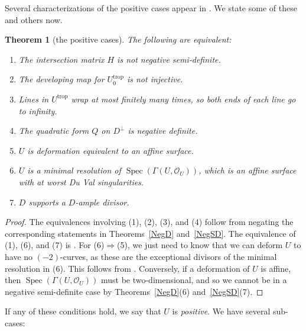 \documentclass[11pt]{article}
\numberwithin{equation}{section}
\numberwithin{figure}{section}
\numberwithin{table}{section}
\DeclareMathOperator{\Spec}{Spec}
\DeclareMathOperator{\trop}{trop}
\let\s=\mathcal
\newtheorem{thm}{Theorem}[section]
\theoremstyle{definition}
\begin{document}
Several characterizations of the positive cases appear in \cite[Lemma~6.9]{GHK1}. We state some of these and others now.
\begin{thm}[the positive cases]\label{Pos} The following are equivalent:
\begin{enumerate}\itemsep=0pt
\item[$1.$] The {intersection matrix} $H$ is not negative semi-definite.
\item[$2.$] The {developing map} for $U^{\trop}_0$ is not injective.
\item[$3.$] {Lines} in $U^{\trop}$ wrap at most finitely many times, so both ends of each line go to infinity.
\item[$4.$] The {quadratic form} $Q$ on $D^{\perp}$ is negative definite.
\item[$5.$] $U$ is deformation equivalent to an affine surface.
\item[$6.$] $U$ is a minimal resolution of $\Spec (\Gamma(U,\s{O}_U))$, which is an affine surface with at worst Du Val singularities.
\item[$7.$] $D$ supports a $D$-ample divisor.
\end{enumerate}
\end{thm}
\begin{proof}The equivalences involving (1), (2), (3), and (4) follow from negating the corresponding statements in Theorems~\ref{NegD} and~\ref{NegSD}. The equivalence of (1), (6), and (7) is \cite[Lemma~6.9(1.1--1.3)]{GHK1}. For (6)$\Rightarrow$(5), we just need to know that we can deform $U$ to have no $(-2)$-curves, as these are the exceptional divisors of the minimal resolution in (6). This follows from \cite[Proposition~4.1]{GHK_MLP}. Conversely, if a deformation of $U$ is affine, then $\Spec (\Gamma(U,\s{O}_U))$ must be two-dimensional, and so we cannot be in a negative semi-definite case by Theorems~\ref{NegD}(6) and~\ref{NegSD}(7).
\end{proof}

If any of these conditions hold, we say that $U$ is {\it positive}. We have several sub-cases:
\end{document}
